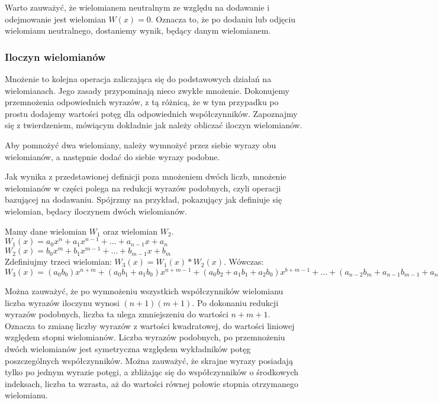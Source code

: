 Warto zauważyć, że wielomianem neutralnym ze względu na dodawanie i odejmowanie jest wielomian $W(x)=0$. Oznacza to, że po dodaniu lub odjęciu wielomianu neutralnego, dostaniemy wynik, będący danym wielomianem.

\subsubsection{Iloczyn wielomianów}

Mnożenie to kolejna operacja zaliczająca się do podstawowych działań na wielomianach. Jego zasady przypominają nieco zwykłe mnożenie. Dokonujemy przemnożenia odpowiednich wyrazów, z tą różnicą, że w tym przypadku po prostu dodajemy wartości potęg dla odpowiednich współczynników. Zapoznajmy się z twierdzeniem, mówiącym dokładnie jak należy obliczać iloczyn wielomianów.

\begin{theorem}
	$ $\\
	Aby pomnożyć dwa wielomiany, należy wymnożyć przez siebie wyrazy obu wielomianów, a następnie dodać do siebie wyrazy podobne.
\end{theorem}

Jak wynika z przedstawionej definicji poza mnożeniem dwóch liczb, mnożenie wielomianów w części polega na redukcji wyrazów podobnych, czyli operacji bazującej na dodawaniu. Spójrzmy na przykład, pokazujący jak definiuje się wielomian, będacy iloczynem dwóch wielomianów.

\begin{example}
	$ $\\
	Mamy dane wielomian $W_1$ oraz wielomian $W_2$. \\
	$W_1(x) = a_0x^n + a_1x^{n-1} + ... + a_{n-1}x + a_n$ \\
	$W_2(x) = b_0x^m + b_1x^{m-1} + ... + b_{m-1}x + b_m$ \\
	Zdefiniujmy trzeci wielomian: $W_3(x) = W_1(x) * W_2(x)$. Wówczas: \\
	$W_3(x) = (a_0b_0)x^{n+m} + (a_0b_1+a_1b_0)x^{n+m-1} + (a_0b_2+a_1b_1+a_2b_0)x^{b+m-1} + ... + (a_{n-2}b_m+a_{n-1}b_{m-1}+a_nb_{m-2})x^2 + (a_{n-1}b_m + a_nb_{m-1})x + a_nb_m$
\end{example}

Można zauważyć, że po wymnożeniu wszystkich współczynników wielomianu liczba wyrazów iloczynu wynosi $(n+1)(m+1)$. Po dokonaniu redukcji wyrazów podobnych, liczba ta ulega zmniejszeniu do wartości $n+m+1$. Oznacza to zmianę liczby wyrazów z wartości kwadratowej, do wartości liniowej względem stopni wielomianów. Liczba wyrazów podobnych, po przemnożeniu dwóch wielomianów jest symetryczna względem wykładników potęg poszczególnych współczynników. Można zauważyć, że skrajne wyrazy posiadają tylko po jednym wyrazie potęgi, a zbliżając się do współczynników o środkowych indeksach, liczba ta wzrasta, aż do wartości równej połowie stopnia otrzymanego wielomianu.

